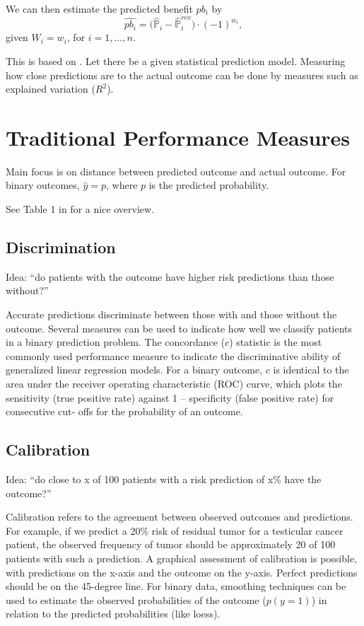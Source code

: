 \documentclass[12pt]{article}
\begin{document}
We can then estimate the predicted benefit $pb_i$ by
\[
	\widehat{pb_i} = 
	\big(\widehat{\mathbb{P}}_i - 
	\widehat{\mathbb{P}}_i^{rev}
	\big) 
	\cdot
	(-1)^{w_i},
\]
given $W_i = w_i$, for $i=1,\dots,n$.

\newpage
This is based on \cite{steyerberg2010}. Let there be a given statistical prediction model. Measuring how close predictions are to the actual outcome can be done by measures such as explained variation ($R^2$). 


\section{Traditional Performance Measures}
Main focus is on distance between predicted outcome and actual outcome. For binary outcomes, $\hat{y} = p$, where $p$ is the predicted probability. 

See Table 1 in \cite{steyerberg2010} for a nice overview.

\subsection{Discrimination}
Idea: ``do patients with the outcome have higher risk predictions than those without?''

Accurate predictions discriminate between those with and those without the outcome. Several measures can be used to indicate how well we classify patients in a binary prediction problem. The concordance ($c$) statistic is the most commonly used performance measure to indicate the discriminative ability of generalized linear regression models. For a binary outcome, $c$ is identical to the area under the receiver operating characteristic (ROC) curve, which plots the sensitivity (true positive rate) against 1 – specificity (false positive rate) for consecutive cut- offs for the probability of an outcome.

\subsection{Calibration}
Idea: ``do close to x of 100 patients
with a risk prediction of x\% have the outcome?''

Calibration refers to the agreement between observed outcomes and predictions. For example, if we predict a 20\% risk of residual tumor for a testicular cancer patient, the observed frequency of tumor should be approximately 20 of 100 patients with such a prediction. A graphical assessment of calibration is possible, with predictions on the x-axis and the outcome on the y-axis. Perfect predictions should be on the 45-degree line. For binary data, smoothing techniques can be used to estimate the observed probabilities of the outcome ($p(y=1)$) in relation to the predicted probabilities (like loess).





\end{document}
